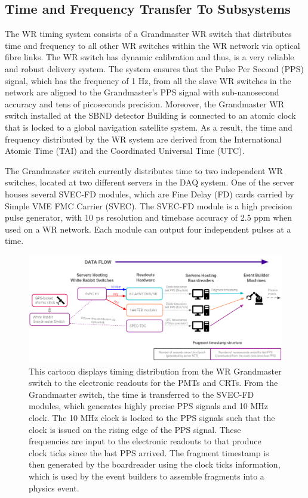 \subsection{Time and Frequency Transfer To Subsystems}
\label{subsec41TimeRef}

The WR timing system consists of a Grandmaster WR switch that distributes time and frequency to all other WR switches within the WR network via optical fibre links.
The WR switch has dynamic calibration and thus, is a very reliable and robust delivery system.
The system ensures that the Pulse Per Second (PPS) signal, which has the frequency of 1 Hz, from all the slave WR switches in the network are aligned to the Grandmaster's PPS signal with sub-nanosecond accuracy and tens of picoseconds precision. 
Moreover, the Grandmaster WR switch installed at the SBND detector Building is connected to an atomic clock that is locked to a global navigation satellite system. 
As a result, the time and frequency distributed by the WR system are derived from the International Atomic Time (TAI) and the Coordinated Universal Time (UTC).

The Grandmaster switch currently distributes time to two independent WR switches, located at two different servers in the DAQ system.
One of the server houses several SVEC-FD modules, which are Fine Delay (FD) cards carried by Simple VME FMC Carrier (SVEC).
The SVEC-FD module is a high precision pulse generator, with 10 ps resolution and timebase accuracy of 2.5 ppm when used on a WR network.
Each module can output four independent pulses at a time.

\begin{figure}[htbp!] 
\centering    
\includegraphics[width=1.0\textwidth]{time_transfer}
\caption[timeTransfer]{
This cartoon displays timing distribution from the WR Grandmaster switch to the electronic readouts for the PMTs and CRTs.
From the Grandmaster switch, the time is transferred to the SVEC-FD modules, which generates highly precise PPS signals and 10 MHz clock.
The 10 MHz clock is locked to the PPS signals such that the clock is issued on the rising edge of the PPS signal.
These frequencies are input to the electronic readouts to that produce clock ticks since the last PPS arrived.
The fragment timestamp is then generated by the boardreader using the clock ticks information, which is used by the event builders to assemble fragments into a physics event.
}
\label{fig:timeTransfer}
\end{figure}

